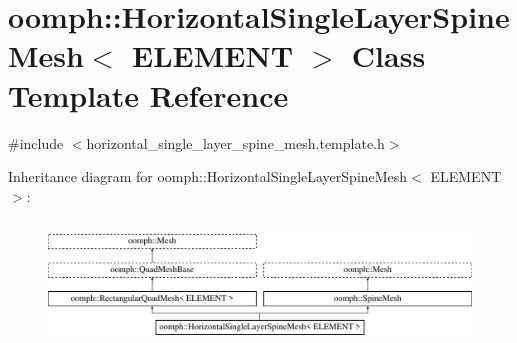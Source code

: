 \hypertarget{classoomph_1_1HorizontalSingleLayerSpineMesh}{}\section{oomph\+:\+:Horizontal\+Single\+Layer\+Spine\+Mesh$<$ E\+L\+E\+M\+E\+NT $>$ Class Template Reference}
\label{classoomph_1_1HorizontalSingleLayerSpineMesh}


{\ttfamily \#include $<$horizontal\+\_\+single\+\_\+layer\+\_\+spine\+\_\+mesh.\+template.\+h$>$}

Inheritance diagram for oomph\+:\+:Horizontal\+Single\+Layer\+Spine\+Mesh$<$ E\+L\+E\+M\+E\+NT $>$\+:\begin{figure}[H]
\begin{center}
\leavevmode
\includegraphics[height=3.363364cm]{classoomph_1_1HorizontalSingleLayerSpineMesh}
\end{center}
\end{figure}
